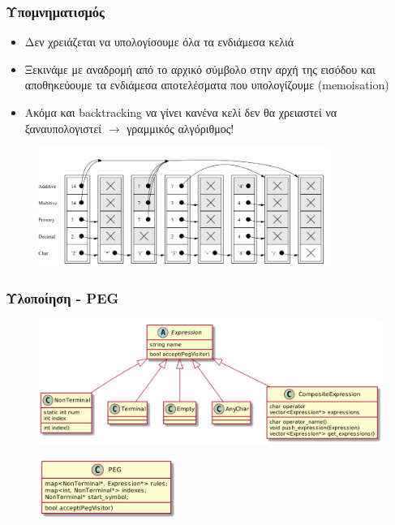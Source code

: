 \documentclass{beamer}
\begin{document}
\begin{frame}
  \frametitle{Υπομνηματισμός}
  \begin{itemize}
	\item Δεν χρειάζεται να υπολογίσουμε όλα τα ενδιάμεσα κελιά
	\item Ξεκινάμε με αναδρομή από το αρχικό σύμβολο στην αρχή της εισόδου και αποθηκεύουμε τα ενδιάμεσα αποτελέσματα που υπολογίζουμε (memoisation) \pause
	\item Ακόμα και backtracking να γίνει κανένα κελί δεν θα χρειαστεί να ξαναυπολογιστεί \pause $\rightarrow$ γραμμικός αλγόριθμος! \pause
  \end{itemize}

\begin{figure}[h]
    \centering
	\includegraphics[width=0.85\textwidth]{../transcript/pics/packrat_memo_example}
\end{figure}

\end{frame}

\begin{frame}
  \frametitle{Υλοποίηση - PEG}
\begin{figure}[h]
    \centering
	\includegraphics[width=1.05\textwidth]{../transcript/uml/peg_elements}
\end{figure} \pause
\begin{figure}[h]
    \centering
	\includegraphics[width=0.40\textwidth]{../transcript/uml/peg}
\end{figure}
\end{frame}
\end{document}
